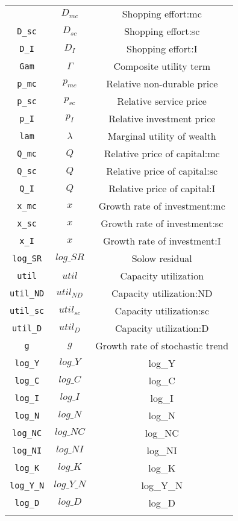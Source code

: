 \begin{center}
\begin{longtable}{ccc}
{\texttt{D\_mc} & ${D_{mc}}$ & Shopping effort:mc\\
\texttt{D\_sc} & ${D_{sc}}$ & Shopping effort:sc\\
\texttt{D\_I} & ${D_I}$ & Shopping effort:I\\
\texttt{Gam} & ${\Gamma}$ & Composite utility term\\
\texttt{p\_mc} & ${p_{mc}}$ & Relative non-durable price\\
\texttt{p\_sc} & ${p_{sc}}$ & Relative service price\\
\texttt{p\_I} & ${p_I}$ & Relative investment price\\
\texttt{lam} & ${\lambda}$ & Marginal utility of wealth\\
\texttt{Q\_mc} & ${Q}$ & Relative price of capital:mc\\
\texttt{Q\_sc} & ${Q}$ & Relative price of capital:sc\\
\texttt{Q\_I} & ${Q}$ & Relative price of capital:I\\
\texttt{x\_mc} & ${x}$ & Growth rate of investment:mc\\
\texttt{x\_sc} & ${x}$ & Growth rate of investment:sc\\
\texttt{x\_I} & ${x}$ & Growth rate of investment:I\\
\texttt{log\_SR} & $log\_SR$ & Solow residual\\
\texttt{util} & ${util}$ & Capacity utilization\\
\texttt{util\_ND} & ${util_{ND}}$ & Capacity utilization:ND\\
\texttt{util\_sc} & ${util_{sc}}$ & Capacity utilization:sc\\
\texttt{util\_D} & ${util_D}$ & Capacity utilization:D\\
\texttt{g} & ${g}$ & Growth rate of stochastic trend\\
\texttt{log\_Y} & $log\_Y$ & log\_Y\\
\texttt{log\_C} & $log\_C$ & log\_C\\
\texttt{log\_I} & $log\_I$ & log\_I\\
\texttt{log\_N} & $log\_N$ & log\_N\\
\texttt{log\_NC} & $log\_NC$ & log\_NC\\
\texttt{log\_NI} & $log\_NI$ & log\_NI\\
\texttt{log\_K} & $log\_K$ & log\_K\\
\texttt{log\_Y\_N} & $log\_Y\_N$ & log\_Y\_N\\
\texttt{log\_D} & $log\_D$ & log\_D\\
}
\end{longtable}
\end{center}
